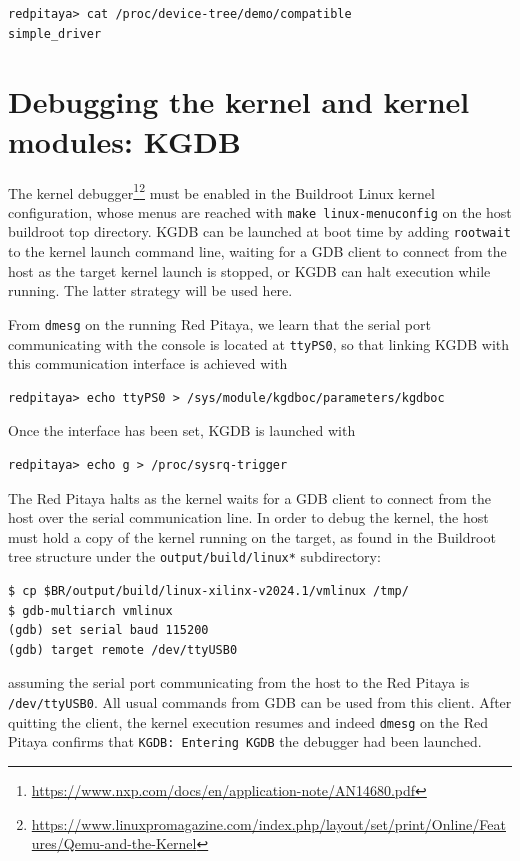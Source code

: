\documentclass{article}
\begin{document}
{{{{\footnotesize
\begin{verbatim}
redpitaya> cat /proc/device-tree/demo/compatible 
simple_driver
\end{verbatim}
}

\section{Debugging the kernel and kernel modules: KGDB}

The kernel debugger\footnote{\url{https://www.nxp.com/docs/en/application-note/AN14680.pdf}}\footnote{\url{https://www.linuxpromagazine.com/index.php/layout/set/print/Online/Features/Qemu-and-the-Kernel}}
must be enabled in the Buildroot Linux kernel configuration, whose menus are
reached with {\tt make linux-menuconfig} on the host buildroot top directory. KGDB can be launched
at boot time by adding {\tt rootwait} to the kernel launch command line, waiting for a GDB client 
to connect from the host as the target kernel launch is stopped, or KGDB can halt execution while 
running. The latter strategy will be used here. 

From {\tt dmesg} on the running Red Pitaya, we learn that the serial port communicating with the
console is located at {\tt ttyPS0}, so that linking KGDB with this communication interface is 
achieved with 

\noindent
\begin{verbatim}
redpitaya> echo ttyPS0 > /sys/module/kgdboc/parameters/kgdboc 
\end{verbatim}

Once the interface has been set, KGDB is launched with

\noindent
\begin{verbatim}
redpitaya> echo g > /proc/sysrq-trigger 
\end{verbatim}

The Red Pitaya halts as the kernel waits for a GDB client to connect from the host over the serial 
communication line. In order to debug the kernel, the host must hold a copy of the kernel running
on the target, as found in the Buildroot tree structure under the {\tt output/build/linux*} subdirectory:

\begin{verbatim}
$ cp $BR/output/build/linux-xilinx-v2024.1/vmlinux /tmp/
$ gdb-multiarch vmlinux
(gdb) set serial baud 115200
(gdb) target remote /dev/ttyUSB0
\end{verbatim}

\noindent assuming the serial port communicating from the host to the Red Pitaya is {\tt /dev/ttyUSB0}.
All usual commands from GDB can be used from this client. After quitting the client, the kernel execution
resumes and indeed {\tt dmesg} on the Red Pitaya confirms that {\tt KGDB: Entering KGDB} the debugger
had been launched.

}}}
\end{document}

